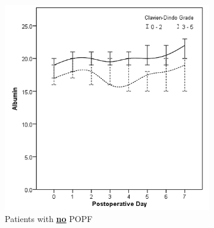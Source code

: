\clearpage
\begin{figure}[t]
	\caption{Relationship between postoperative serum albumin and clinically significant infective complications in patients without (A) and with (B) POPF.}
	\label{fig:crp_comp_Albumin_infective_leak}
	\centering
	\begin{subfigure}{0.48\textwidth}
		\centering
		\includegraphics[width=\textwidth]{Figures/crp_comp_Albumin_infective_leak0}
		\caption{Patients with \textbf{\underline{no}} POPF}
		\label{fig:crp_comp_Albumin_infective_leak0}
	\end{subfigure}
	\hfill
	\begin{subfigure}{0.48\textwidth}
		\centering

\end{subfigure}
\end{figure}
